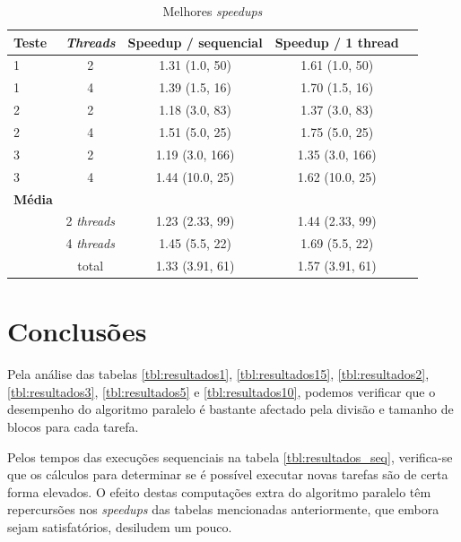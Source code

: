 \documentclass[12pt]{article}
\begin{document}
\begin{table}[H]
  \begin{center}
    \begin{tabular}{ | l | c | c | c | c |}
      \hline
      \textbf{Teste} & \textbf{\textit{Threads}} & \textbf{Speedup / sequencial} & \textbf{Speedup / 1 thread}\\ \hline
      1 & 2 & 1.31 (1.0, 50) & 1.61 (1.0, 50) \\ \hline
      1 & 4 & 1.39 (1.5, 16) & 1.70 (1.5, 16) \\ \hline
      2 & 2 & 1.18 (3.0, 83) & 1.37 (3.0, 83) \\ \hline
      2 & 4 & 1.51 (5.0, 25) & 1.75 (5.0, 25) \\ \hline
      3 & 2 & 1.19 (3.0, 166) & 1.35 (3.0, 166) \\ \hline
      3 & 4 & 1.44 (10.0, 25) & 1.62 (10.0, 25) \\ \hline \hline
      \textbf{Média} & & & \\ \hline
      & 2 \textit{threads} & 1.23 (2.33, 99) & 1.44 (2.33, 99) \\ \hline
      & 4 \textit{threads} & 1.45 (5.5, 22) & 1.69 (5.5, 22) \\ \hline
      & total & 1.33 (3.91, 61) & 1.57 (3.91, 61) \\ \hline  
  \end{tabular}
  \caption{Melhores \textit{speedups}}
  \label{tbl:best_results}
  \end{center}
\end{table}

\section{Conclusões}

Pela análise das tabelas \ref{tbl:resultados1}, \ref{tbl:resultados15}, \ref{tbl:resultados2}, \ref{tbl:resultados3},
\ref{tbl:resultados5} e \ref{tbl:resultados10}, podemos verificar que o desempenho do algoritmo paralelo é bastante
afectado pela divisão e tamanho de blocos para cada tarefa.

Pelos tempos das execuções sequenciais na tabela \ref{tbl:resultados_seq}, verifica-se que os cálculos
para determinar se é possível executar novas tarefas são de certa forma elevados. O efeito destas computações
extra do algoritmo paralelo têm repercursões nos \textit{speedups} das tabelas mencionadas anteriormente,
que embora sejam satisfatórios, desiludem um pouco.
\end{document}
